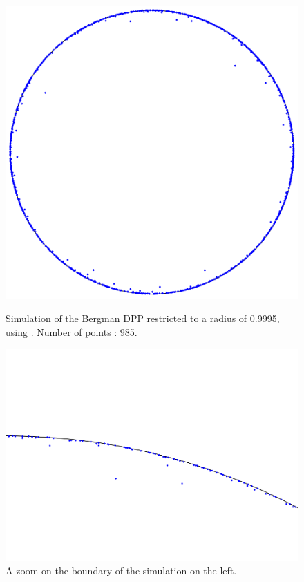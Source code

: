 \documentclass[11pt]{article}
\theoremstyle{plain}
\theoremstyle{definition}
\begin{document}
\begin{figure}[h] \label{fig:main-fig}
    \centering
    \begin{minipage}{0.45\textwidth}
        \centering
        \includegraphics[width=\linewidth]{bergman.png} %
        \caption{Simulation of the Bergman DPP restricted to a radius of 0.9995, using \cite{MorozSoftware}. Number of points : 985.}
    \end{minipage}
    \hfill
    \begin{minipage}{0.45\textwidth}
        \centering
        \includegraphics[width=\linewidth]{bergman_zoom.png} %
        \caption{A zoom on the boundary of the simulation on the left.}
    \end{minipage}
\end{figure}
\end{document}
